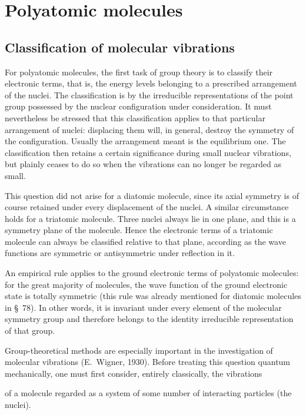\chapter{Polyatomic molecules}
\setcounter{section}{99}
\setcounter{figure}{40}
\section{Classification of molecular vibrations}

For polyatomic molecules, the first task of group theory is to classify their electronic terms, that is, the energy levels belonging to a prescribed arrangement of the nuclei. The classification is by the irreducible representations of the point group possessed by the nuclear configuration under consideration. It must nevertheless be stressed that this classification applies to that particular arrangement of nuclei: displacing them will, in general, destroy the symmetry of the configuration. Usually the arrangement meant is the equilibrium one. The classification then retains a certain significance during small nuclear vibrations, but plainly ceases to do so when the vibrations can no longer be regarded as small.

This question did not arise for a diatomic molecule, since its axial symmetry is of course retained under every displacement of the nuclei. A similar circumstance holds for a triatomic molecule. Three nuclei always lie in one plane, and this is a symmetry plane of the molecule. Hence the electronic terms of a triatomic molecule can always be classified relative to that plane, according as the wave functions are symmetric or antisymmetric under reflection in it.

An empirical rule applies to the ground electronic terms of polyatomic molecules: for the great majority of molecules, the wave function of the ground electronic state is totally symmetric (this rule was already mentioned for diatomic molecules in \S~78). In other words, it is invariant under every element of the molecular symmetry group and therefore belongs to the identity irreducible representation of that group.

Group-theoretical methods are especially important in the investigation of molecular vibrations (E.~Wigner, 1930). Before treating this question quantum mechanically, one must first consider, entirely classically, the vibrations

of a molecule regarded as a system of some number of interacting particles (the nuclei).

